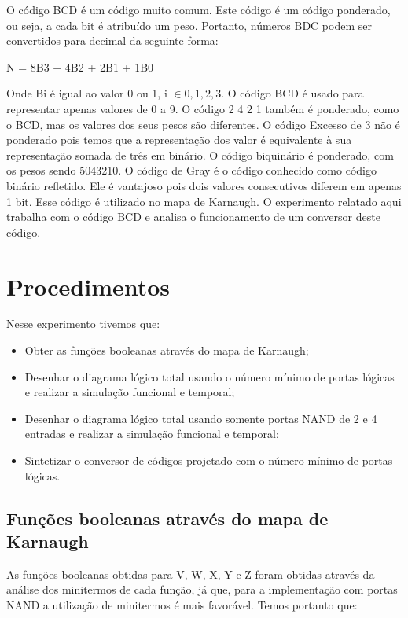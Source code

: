 \documentclass[12pt]{article}
\begin{document}
O código BCD é um código muito comum. Este código é um código ponderado, ou seja, a cada bit é atribuído um peso. Portanto, números BDC podem ser convertidos para decimal da seguinte forma:

N = 8B{\tiny 3} + 4B{\tiny 2} + 2B{\tiny 1} + 1B{\tiny 0}

Onde Bi é igual ao valor 0 ou 1, i $\in {0,1,2,3}$. O código BCD é usado para representar apenas valores de 0 a 9.
O código 2 4 2 1 também é ponderado, como o BCD, mas os valores dos seus pesos são diferentes. O código Excesso de 3 não é ponderado pois temos que a representação dos valor é equivalente à sua representação somada de três em binário. O código biquinário é ponderado, com os pesos sendo 5043210.
O código de Gray é o código conhecido como código binário refletido. Ele é vantajoso pois dois valores consecutivos diferem em apenas 1 bit. Esse código é utilizado no mapa de Karnaugh.
O experimento relatado aqui trabalha com o código BCD e analisa o funcionamento de um conversor deste código.


\section{Procedimentos}
\label{sec:Procedimentos}

Nesse experimento tivemos que:

\begin{itemize}
	\item Obter as funções booleanas através do mapa de Karnaugh;
	\item Desenhar o diagrama lógico total usando o número mínimo de portas lógicas e realizar a simulação funcional e temporal;
	\item Desenhar o diagrama lógico total usando somente portas NAND de 2 e 4 entradas e realizar a simulação funcional e temporal;
	\item Sintetizar o conversor de códigos projetado com o número mínimo de portas lógicas.
		
\end{itemize}

\subsection{Funções booleanas através do mapa de Karnaugh}
\label{sec:karnaugh}

As funções booleanas obtidas para V, W, X, Y e Z foram obtidas através da análise dos minitermos de cada função, já que, para a implementação com portas NAND a utilização de minitermos é mais favorável. Temos portanto que:
\end{document}
